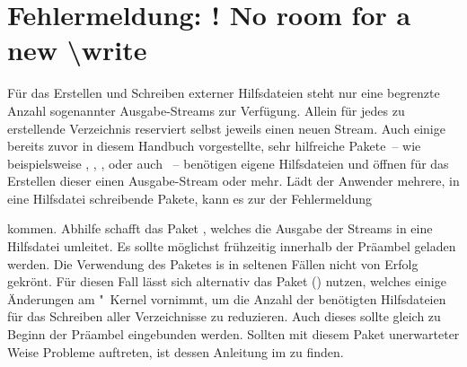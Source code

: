 \section{Fehlermeldung: ! No room for a new \textbackslash write}
%
Für das Erstellen und Schreiben externer Hilfsdateien steht  nur 
eine begrenzte Anzahl sogenannter Ausgabe-Streams zur Verfügung. Allein für 
jedes zu erstellende Verzeichnis reserviert  selbst jeweils einen 
neuen Stream. Auch einige bereits zuvor in diesem Handbuch vorgestellte, sehr 
hilfreiche Pakete~-- wie beispielsweise , , 
,  oder auch ~-- 
benötigen eigene Hilfsdateien und öffnen für das Erstellen dieser einen 
Ausgabe-Stream oder mehr. Lädt der Anwender mehrere, in eine Hilfsdatei 
schreibende Pakete, kann es zur der Fehlermeldung
%
\begin{quoting}
\end{quoting}
%
kommen. Abhilfe schafft das Paket , welches die Ausgabe der 
Streams in eine Hilfsdatei umleitet. Es sollte möglichst frühzeitig innerhalb 
der Präambel geladen werden. Die Verwendung des Paketes is in seltenen Fällen 
nicht von Erfolg gekrönt. Für diesen Fall lässt sich alternativ das Paket 
() nutzen, welches einige Änderungen am 
"~Kernel vornimmt, um die Anzahl der benötigten Hilfsdateien für 
das Schreiben aller Verzeichnisse zu reduzieren. Auch dieses sollte gleich zu 
Beginn der Präambel eingebunden werden. Sollten mit diesem Paket unerwarteter 
Weise Probleme auftreten, ist dessen Anleitung im \scrguide zu finden. 



